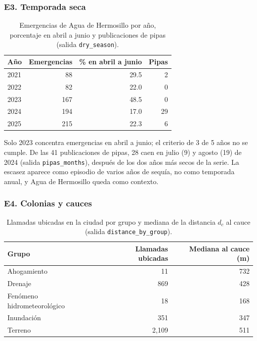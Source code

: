 \documentclass[11pt]{article}
\newcommand{\cod}[1]{\nolinkurl{#1}}
\begin{document}
\FloatBarrier
\subsubsection*{E3. Temporada seca}

\begin{table}[!htbp]
  \centering
  \small
  \caption{Emergencias de Agua de Hermosillo por año, porcentaje en abril a junio y publicaciones de pipas (salida \cod{dry_season}).}
  \label{tab:e3}
  \begin{tabular}{lrrr}
    \toprule
    Año & Emergencias & \% en abril a junio & Pipas \\
    \midrule
    2021 & 88 & 29.5 & 2 \\
    2022 & 82 & 22.0 & 0 \\
    2023 & 167 & 48.5 & 0 \\
    2024 & 194 & 17.0 & 29 \\
    2025 & 215 & 22.3 & 6 \\
    \bottomrule
  \end{tabular}
\end{table}

Solo 2023 concentra emergencias en abril a junio; el criterio de 3 de 5 años no se cumple. De las 41 publicaciones de pipas, 28 caen en julio (9) y agosto (19) de 2024 (salida \cod{pipas_months}), después de los dos años más secos de la serie. La escasez aparece como episodio de varios años de sequía, no como temporada anual, y Agua de Hermosillo queda como contexto.

\FloatBarrier
\subsubsection*{E4. Colonias y cauces}

\begin{table}[!htbp]
  \centering
  \small
  \caption{Llamadas ubicadas en la ciudad por grupo y mediana de la distancia $d_c$ al cauce (salida \cod{distance_by_group}).}
  \label{tab:e4-grupo}
  \begin{tabular}{lrr}
    \toprule
    Grupo & Llamadas ubicadas & Mediana al cauce (m) \\
    \midrule
    Ahogamiento & 11 & 732 \\
    Drenaje & 869 & 428 \\
    Fenómeno hidrometeorológico & 18 & 168 \\
    Inundación & 351 & 347 \\
    Terreno & 2,109 & 511 \\
    \bottomrule
  \end{tabular}
\end{table}
\end{document}
